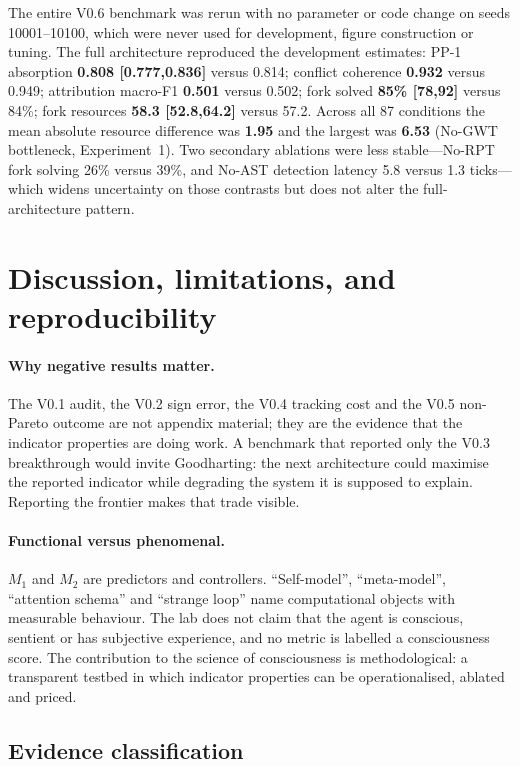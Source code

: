 \documentclass{article}
\begin{document}
The entire V0.6 benchmark was rerun with no parameter or code change on seeds 10001--10100, which
were never used for development, figure construction or tuning. The full architecture reproduced the
development estimates: PP-1 absorption \textbf{0.808 [0.777,0.836]} versus 0.814; conflict coherence
\textbf{0.932} versus 0.949; attribution macro-F1 \textbf{0.501} versus 0.502; fork solved
\textbf{85\% [78,92]} versus 84\%; fork resources \textbf{58.3 [52.8,64.2]} versus 57.2. Across all 87
conditions the mean absolute resource difference was \textbf{1.95} and the largest was \textbf{6.53}
(No-GWT bottleneck, Experiment~1). Two secondary ablations were less stable---No-RPT fork solving
26\% versus 39\%, and No-AST detection latency 5.8 versus 1.3 ticks---which widens uncertainty on
those contrasts but does not alter the full-architecture pattern.

\section{Discussion, limitations, and reproducibility}

\paragraph{Why negative results matter.}
The V0.1 audit, the V0.2 sign error, the V0.4 tracking cost and the V0.5 non-Pareto outcome are not appendix material; they are the evidence that the indicator properties are doing work. A benchmark that reported only the V0.3 breakthrough would invite Goodharting: the next architecture could maximise the reported indicator while degrading the system it is supposed to explain. Reporting the frontier makes that trade visible.

\paragraph{Functional versus phenomenal.}
$M_1$ and $M_2$ are predictors and controllers. ``Self-model'', ``meta-model'', ``attention schema'' and ``strange loop'' name computational objects with measurable behaviour. The lab does not claim that the agent is conscious, sentient or has subjective experience, and no metric is labelled a consciousness score. The contribution to the science of consciousness is methodological: a transparent testbed in which indicator properties can be operationalised, ablated and priced.

\subsection{Evidence classification}
\end{document}

